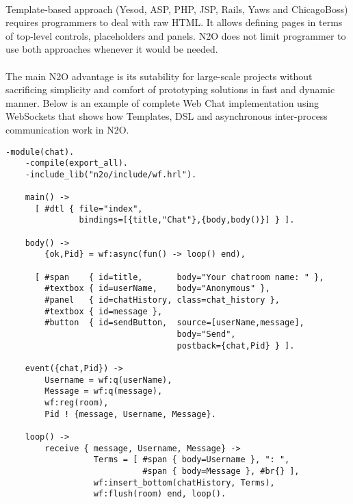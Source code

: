 \paragraph{}
Template-based approach (Yesod, ASP, PHP, JSP, Rails, Yaws and ChicagoBoss)
requires programmers to deal with raw HTML. It allows
defining pages in terms of top-level controls, placeholders
and panels. N2O does not limit programmer to use both approaches whenever it would be needed.

\paragraph{}
The main N2O advantage is its sutability for large-scale projects without sacrificing simplicity and comfort of prototyping solutions in fast and dynamic manner. 
Below is an example of complete Web Chat implementation using
WebSockets that shows how  Templates, DSL and asynchronous
inter-process communication work in N2O.

\newpage
\vspace{1\baselineskip}
\begin{lstlisting}[caption=chat.erl]
    -module(chat).
    -compile(export_all).
    -include_lib("n2o/include/wf.hrl").

    main() -> 
      [ #dtl { file="index", 
               bindings=[{title,"Chat"},{body,body()}] } ].

    body() ->
        {ok,Pid} = wf:async(fun() -> loop() end),

      [ #span    { id=title,       body="Your chatroom name: " }, 
        #textbox { id=userName,    body="Anonymous" },
        #panel   { id=chatHistory, class=chat_history },
        #textbox { id=message },
        #button  { id=sendButton,  source=[userName,message],
                                   body="Send", 
                                   postback={chat,Pid} } ].

    event({chat,Pid}) ->
        Username = wf:q(userName),
        Message = wf:q(message),
        wf:reg(room),
        Pid ! {message, Username, Message}.

    loop() ->
        receive { message, Username, Message} ->
                  Terms = [ #span { body=Username }, ": ",
                            #span { body=Message }, #br{} ],
                  wf:insert_bottom(chatHistory, Terms),
                  wf:flush(room) end, loop().
\end{lstlisting}
\vspace{1\baselineskip}

